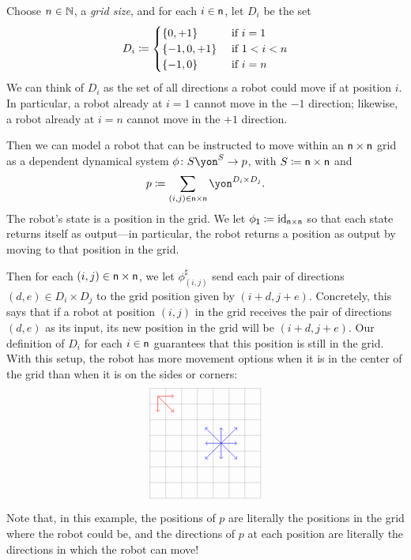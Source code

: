 \documentclass[Book-Poly]{subfiles}
\begin{document}
\begin{example}\label{ex.grid_robot}
Choose $n\in\mathbb{N}$, a \emph{grid size}, and for each $i\in\mathsf{n}$, let $D_i$ be the set
\[
	D_i\coloneqq
	\begin{cases}
		\{0,+1\}&\textnormal{ if }i=1\\
		\{-1,0,+1\}&\textnormal{ if } 1<i<n\\
		\{-1,0\}&\textnormal{ if }i=n
	\end{cases}
\]
We can think of $D_i$ as the set of all directions a robot could move if at position $i$.
In particular, a robot already at $i=1$ cannot move in the $-1$ direction; likewise, a robot already at $i=n$ cannot move in the $+1$ direction.

Then we can model a robot that can be instructed to move within an $\mathsf{n}\times\mathsf{n}$ grid as a dependent dynamical system $\phi\colon S\yon^S\to p$, with $S\coloneqq\mathsf{n}\times\mathsf{n}$ and
\[
    p\coloneqq\sum_{(i,j)\in\ord{n}\times\ord{n}}\yon^{D_i\times D_j}.
\]
The robot's state is a position in the grid.
We let $\phi_{\textsf{1}}\coloneqq\mathrm{id}_{\mathsf{n}\times\mathsf{n}}$ so that each state returns itself as output---in particular, the robot returns a position as output by moving to that position in the grid.

Then for each $(i,j)\in\mathsf{n}\times\mathsf{n}$, we let $\phi^\sharp_{(i,j)}$ send each pair of directions $(d,e)\in D_i\times D_j$ to the grid position given by $(i+d,j+e)$.
Concretely, this says that if a robot at position $(i,j)$ in the grid receives the pair of directions $(d,e)$ as its input, its new position in the grid will be $(i+d,j+e)$.
Our definition of $D_i$ for each $i\in\mathsf{n}$ guarantees that this position is still in the grid.
With this setup, the robot has more movement options when it is in the center of the grid than when it is on the sides or corners:
\[
\begin{tikzpicture}[scale=.5]
  \draw[step=1cm,gray,very thin] (-3,-3) grid (4,4);
	\draw[->, red ] (-2.5,3.5) -- (-1.5, 3.5);
	\draw[->, red ] (-2.5,3.5) -- (-1.5, 2.5);
	\draw[->, red ] (-2.5,3.5) -- (-2.5, 2.5);
	\draw[->, blue] (1.5, 0.5) -- (0.5, 0.5);
	\draw[->, blue] (1.5, 0.5) -- (2.5, 0.5);
	\draw[->, blue] (1.5, 0.5) -- (1.5, 1.5);
	\draw[->, blue] (1.5, 0.5) -- (1.5,-0.5);
	\draw[->, blue] (1.5, 0.5) -- (0.5, 1.5);
	\draw[->, blue] (1.5, 0.5) -- (0.5,-0.5);
	\draw[->, blue] (1.5, 0.5) -- (2.5, 1.5);
	\draw[->, blue] (1.5, 0.5) -- (2.5,-0.5);
\end{tikzpicture}
\]

Note that, in this example, the positions of $p$ are literally the positions in the grid where the robot could be, and the directions of $p$ at each position are literally the directions in which the robot can move!
\end{example}
\end{document}
